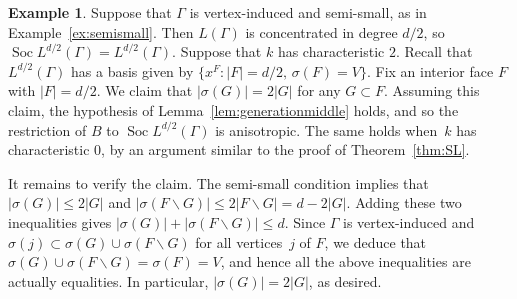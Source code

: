 \documentclass[11pt]{article}
\theoremstyle{definition}
\newtheorem{example}[theo]{Example}
\numberwithin{equation}{section}
\numberwithin{equation}{section}
\begin{document}
\begin{example}
Suppose that $\Gamma$ is vertex-induced and semi-small, as in Example~\ref{ex:semismall}. Then $L(\Gamma)$ is concentrated in degree $d/2$, so $\operatorname{Soc} L^{d/2}(\Gamma) = L^{d/2}(\Gamma)$. Suppose that $k$ has characteristic $2$. 
Recall that  $L^{d/2}(\Gamma)$ has a basis given by \mbox{$\{x^F : |F| = d/2, \, \sigma(F) = V\}$}. Fix an interior face $F$ with  $|F| = d/2$. 
We claim that $|\sigma(G)| = 2 |G|$ for any $G \subset F$. Assuming this claim, the hypothesis of Lemma~\ref{lem:generationmiddle} holds, and so the restriction of $B$ to $\operatorname{Soc} L^{d/2}(\Gamma)$ is anisotropic. The same holds when~$k$ has characteristic $0$, by an argument similar to the proof of Theorem~\ref{thm:SL}. 

It remains to verify the claim. 
The semi-small condition implies that \mbox{$|\sigma(G)| \le 2 |G|$} and $|\sigma(F \smallsetminus G)| \le 2 |F \smallsetminus G| = d - 2|G|$.
Adding these two inequalities gives $|\sigma(G)| + |\sigma(F \smallsetminus G)| \le d$. 
Since $\Gamma$ is vertex-induced and $\sigma(j) \subset \sigma(G) \cup \sigma(F \smallsetminus G)$ for all vertices~$j$ of $F$, we deduce that 
$\sigma(G) \cup \sigma(F \smallsetminus G) = \sigma(F) = V$, and hence all the above inequalities are actually equalities. In particular, $|\sigma(G)| = 2 |G|$, as desired.

\end{example}
\end{document}

